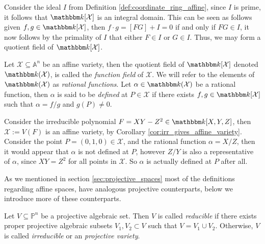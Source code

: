 \newpage
Consider the ideal $I$ from Definition \ref{def:coordinate_ring_affine}, since $I$ is prime, it follows that $\K[\mathcal{X}]$ is an integral domain. This can be seen as follows given $f, g \in \K[\mathcal{X}]$, then $f \cdot g = [FG] + I = 0$ if and only if $FG \in I$, it now follows by the primality of $I$ that either $F \in I$ or $G \in I$. Thus, we may form a quotient field of $\K[\mathcal{X}]$.
\begin{definition}\label{def:rational_function_field_affine}
  Let $\mathcal{X} \subseteq \mathbb{A}^{n}$ be an affine variety, then the quotient field of $\K[\mathcal{X}]$ denoted $\K(\mathcal{X})$, is called the \textit{function field} of $\mathcal{X}$. We will refer to the elements of $\K(\mathcal{X})$ as \textit{rational functions}. Let $\alpha \in \K(\mathcal{X})$ be a rational function, then $\alpha$ is said to be \textit{defined} at $P \in \mathcal{X}$ if there exists $f, g \in \K[\mathcal{X}]$ such that $\alpha = f / g$ and $g(P) \neq 0$.
\end{definition}

\begin{example}\label{exmp:coordinate_ring_and_rational_function_field}
  Consider the irreducible polynomial $F = XY - Z^{2} \in \K[X, Y, Z]$, then $\mathcal{X} := V(F)$ is an affine variety, by Corollary \ref{cor:irr_gives_affine_variety}. Consider the point $P = (0, 1, 0) \in \mathcal{X}$, and the rational function $\alpha = X / Z$, then it would appear that $\alpha$ is not defined at $P$, however $Z / Y$ is also a representative of $\alpha$, since $XY = Z^{2}$ for all points in $\mathcal{X}$. So $\alpha$ is actually defined at $P$ after all.
\end{example}

As we mentioned in section \ref{sec:projective_spaces} most of the definitions regarding affine spaces, have analogous projective counterparts, below we introduce more of these counterparts.

\begin{definition}\label{def:projective_variety}
Let $V \subseteq \mathbb{P}^{n}$ be a projective algebraic set. Then $V$ is called \textit{reducible} if there exists proper projective algebraic subsets $V_{1}, V_{2} \subset V$ such that $V = V_{1} \cup V_{2}$. Otherwise, $V$ is called \textit{irreducible} or an \textit{projective variety}.
\end{definition}

